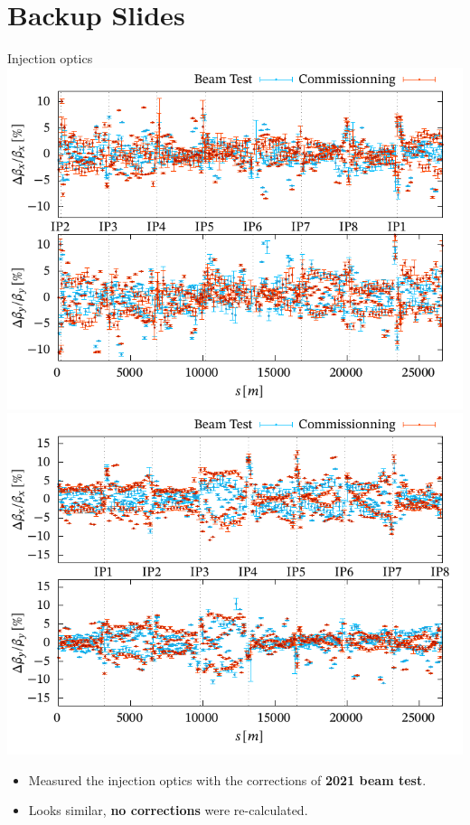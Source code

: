 \documentclass[4pt,usenames,dvipsnames,aspectratio=169,table]{beamer}
\newcommand{\highl}[1]{\textbf{#1}}
\begin{document}
\section{Backup Slides}




\begin{frame}{Injection optics}
    \includegraphics[width=0.49\linewidth]{images/beamtest/b1_bb.pdf}
    \hfill
    \includegraphics[width=0.49\linewidth]{images/beamtest/b2_bb.pdf}
    
    \begin{itemize}
        \item  Measured the injection optics with the corrections of \highl{2021 beam test}.
        \item Looks similar, \highl{no corrections} were re-calculated.
    \end{itemize}
\end{frame}


\end{document}

